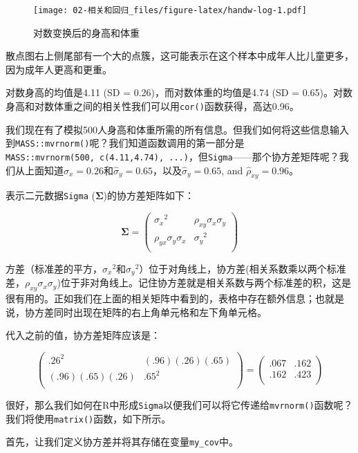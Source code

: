 \documentclass[
]{book}
\begin{document}
\begin{figure}
\centering
\texttt{[image: 02-相关和回归\_files/figure-latex/handw-log-1.pdf]}
\caption{\label{fig:handw-log}对数变换后的身高和体重}
\end{figure}

散点图右上侧尾部有一个大的点簇，这可能表示在这个样本中成年人比儿童更多，因为成年人更高和更重。

对数身高的均值是4.11 (SD = 0.26)，而对数体重的均值是4.74 (SD = 0.65)。对数身高和对数体重之间的相关性我们可以用\texttt{cor()}函数获得，高达0.96。

我们现在有了模拟500人身高和体重所需的所有信息。但我们如何将这些信息输入到\texttt{MASS::mvrnorm()}呢？我们知道函数调用的第一部分是\texttt{MASS::mvrnorm(500,\ c(4.11,4.74),\ ...)}，但\texttt{Sigma}------那个协方差矩阵呢？我们从上面知道\(\hat{\sigma}_x = 0.26\)和\(\hat{\sigma}_y = 0.65\)，以及\(\hat{\sigma}_y = 0.65\), and \(\hat{\rho}_{xy} = 0.96\)。

表示二元数据\texttt{Sigma} (\(\mathbf{\Sigma}\))的协方差矩阵如下：

\[
\mathbf{\Sigma} =
\begin{pmatrix}
{\sigma_x}^2                & \rho_{xy} \sigma_x \sigma_y \\
\rho_{yx} \sigma_y \sigma_x & {\sigma_y}^2 \\
\end{pmatrix}
\]

方差（标准差的平方，\({\sigma_x}^2\)和\({\sigma_y}^2\)）位于对角线上，协方差(相关系数乘以两个标准差，\(\rho_{xy} \sigma_x \sigma_y\))位于非对角线上。记住协方差就是相关系数与两个标准差的积，这是很有用的。正如我们在上面的相关矩阵中看到的，表格中存在额外信息；也就是说，协方差同时出现在矩阵的右上角单元格和左下角单元格。

代入之前的值，协方差矩阵应该是：

\[
\begin{pmatrix}
.26^2 & (.96)(.26)(.65) \\
(.96)(.65)(.26) & .65^2 \\
\end{pmatrix} =
\begin{pmatrix}
.067 & .162 \\
.162 & .423 \\
\end{pmatrix}
\]

很好，那么我们如何在R中形成\texttt{Sigma}以便我们可以将它传递给\texttt{mvrnorm()}函数呢？我们将使用\texttt{matrix()}函数，如下所示。

首先，让我们定义协方差并将其存储在变量\texttt{my\_cov}中。
\end{document}
